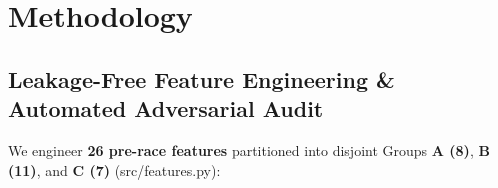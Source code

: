 \documentclass[10pt,a4paper,twocolumn]{article}
\newcommand{\code}[1]{{\fontsize{8.5pt}{10pt}\selectfont\ttfamily #1}}
\begin{document}
\section{Methodology}

\subsection{Leakage-Free Feature Engineering \& Automated Adversarial Audit}
We engineer \textbf{26 pre-race features} partitioned into disjoint Groups \textbf{A (8)}, \textbf{B (11)}, and \textbf{C (7)} (\code{src/features.py}):

\end{document}
